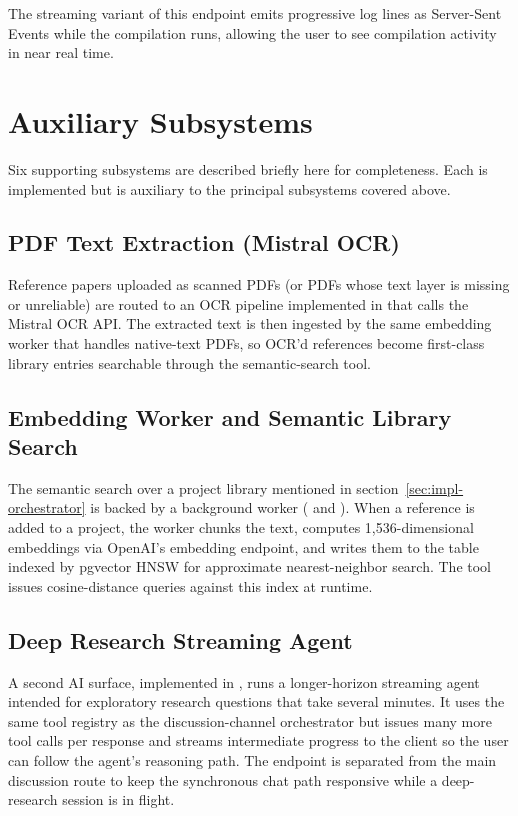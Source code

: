 The streaming variant of this endpoint emits progressive log lines as Server-Sent Events while the compilation runs, allowing the user to see compilation activity in near real time.

\section{Auxiliary Subsystems}
\label{sec:impl-auxiliary}

Six supporting subsystems are described briefly here for completeness. Each is implemented but is auxiliary to the principal subsystems covered above.

\subsection{PDF Text Extraction (Mistral OCR)}
Reference papers uploaded as scanned PDFs (or PDFs whose text layer is missing or unreliable) are routed to an OCR pipeline implemented in  that calls the Mistral OCR API. The extracted text is then ingested by the same embedding worker that handles native-text PDFs, so OCR'd references become first-class library entries searchable through the semantic-search tool.

\subsection{Embedding Worker and Semantic Library Search}
The semantic search over a project library mentioned in section~\ref{sec:impl-orchestrator} is backed by a background worker ( and ). When a reference is added to a project, the worker chunks the text, computes 1{,}536-dimensional embeddings via OpenAI's embedding endpoint, and writes them to the  table indexed by pgvector HNSW for approximate nearest-neighbor search. The  tool issues cosine-distance queries against this index at runtime.

\subsection{Deep Research Streaming Agent}
A second AI surface, implemented in , runs a longer-horizon streaming agent intended for exploratory research questions that take several minutes. It uses the same tool registry as the discussion-channel orchestrator but issues many more tool calls per response and streams intermediate progress to the client so the user can follow the agent's reasoning path. The endpoint is separated from the main discussion route to keep the synchronous chat path responsive while a deep-research session is in flight.

